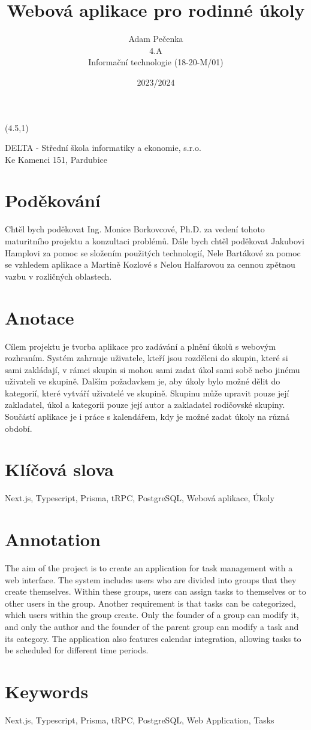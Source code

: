 \documentclass[a4paper,12pt]{report}
\title{Webová aplikace pro rodinné úkoly}
\author{Adam Pečenka\\ 4.A\\ Informační technologie (18-20-M/01)\\}
\date{2023/2024}
\newcommand{\unnumberedsection}[1]{%
  \section*{#1}%
}
\begin{document}
\onehalfspacing 
\linespread{1.125}
\begin{textblock}{7}(4.5,1)
\begin{center}
\noindent \normalsize DELTA - Střední škola informatiky a ekonomie, s.r.o.\\Ke Kamenci 151, Pardubice
\end{center}
\end{textblock}
\maketitle

\pagebreak
\unnumberedsection{Poděkování}
Chtěl bych poděkovat Ing. Monice Borkovcové, Ph.D. za vedení tohoto maturitního projektu a
konzultaci problémů. Dále bych chtěl poděkovat Jakubovi Hamplovi za pomoc se složením použitých technologií, Nele Bartákové za pomoc se vzhledem aplikace a Martině Kozlové s Nelou Halfarovou za cennou zpětnou vazbu v rozličných oblastech.
\pagebreak

\pagebreak
\unnumberedsection{Anotace}
Cílem projektu je tvorba aplikace pro zadávání a plnění úkolů s webovým rozhraním.
Systém zahrnuje uživatele, kteří jsou rozděleni do skupin, které si sami zakládají, v rámci skupin si mohou sami zadat úkol sami sobě nebo jinému uživateli ve skupině. Dalším požadavkem je, aby úkoly bylo možné dělit do kategorií, které vytváří uživatelé ve skupině. Skupinu může upravit pouze její zakladatel, úkol a kategorii pouze její autor a zakladatel rodičovské skupiny. Součástí aplikace je i práce s kalendářem, kdy je možné zadat úkoly na různá období.
\unnumberedsection{Klíčová slova}
Next.js, Typescript, Prisma, tRPC, PostgreSQL, Webová aplikace, Úkoly
\unnumberedsection{Annotation}
The aim of the project is to create an application for task management with a web interface. The system includes users who are divided into groups that they create themselves. Within these groups, users can assign tasks to themselves or to other users in the group. Another requirement is that tasks can be categorized, which users within the group create. Only the founder of a group can modify it, and only the author and the founder of the parent group can modify a task and its category. The application also features calendar integration, allowing tasks to be scheduled for different time periods.

\unnumberedsection{Keywords}
Next.js, Typescript, Prisma, tRPC, PostgreSQL, Web Application, Tasks
\pagebreak
\end{document}
